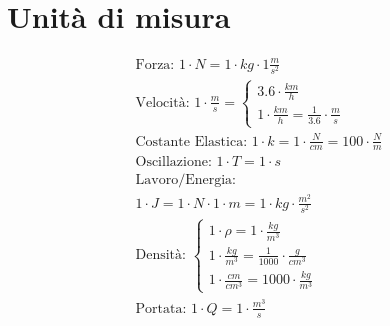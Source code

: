\section{Unità di misura}

\begin{gather*}
  \text{Forza: } 1 \cdot N = 1 \cdot kg \cdot 1 \frac{m}{s^2} \\
  \text{Velocità: } 1 \cdot \frac{m}{s} = \begin{cases}
    3.6 \cdot \frac{km}{h} \\
1   \cdot \frac{km}{h} = \frac{1}{3.6} \cdot \frac{m}{s}
  \end{cases} \\
  \text{Costante Elastica: } 1 \cdot k = 1 \cdot \frac{N}{cm} = 100 \cdot \frac{N}{m} \\
  \text{Oscillazione: } 1 \cdot T = 1 \cdot s \\
  \text{Lavoro/Energia: } \\ 1 \cdot J = 1 \cdot N \cdot 1 \cdot m = 1 \cdot kg \cdot \frac{m^2}{s^2} \\
  \text{Densità: } \begin{cases}
    1 \cdot \rho = 1 \cdot \frac{kg}{m^3} \\
    1 \cdot \frac{kg}{m^3} = \frac{1}{1000} \cdot \frac{g}{cm^3} \\
    1 \cdot \frac{cm}{cm^3} = 1000 \cdot \frac{kg}{m^3}
  \end{cases} \\
  \text{Portata: } 1 \cdot Q = 1 \cdot \frac{m^3}{s}
\end{gather*}